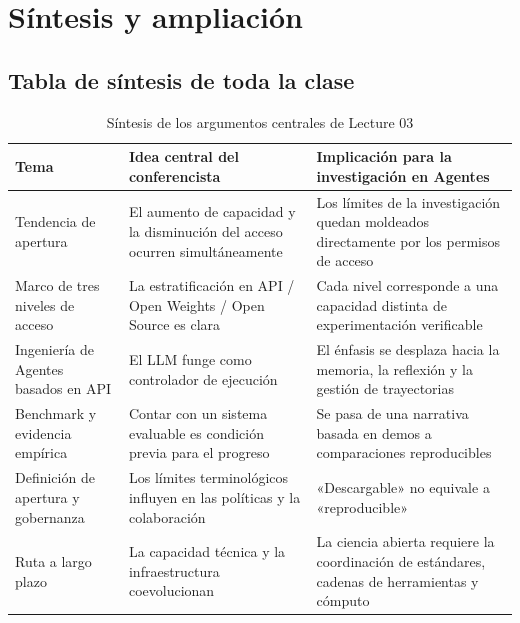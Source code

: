 \documentclass[a4paper]{article}
\begin{document}
\section{Síntesis y ampliación}

\subsection{Tabla de síntesis de toda la clase}
\begin{table}[H]
\centering
\begin{tabular}{p{2.8cm}p{4.1cm}p{4.6cm}}
\toprule
\textbf{Tema} & \textbf{Idea central del conferencista} & \textbf{Implicación para la investigación en Agentes} \\
\midrule
Tendencia de apertura & El aumento de capacidad y la disminución del acceso ocurren simultáneamente & Los límites de la investigación quedan moldeados directamente por los permisos de acceso \\
Marco de tres niveles de acceso & La estratificación en API / Open Weights / Open Source es clara & Cada nivel corresponde a una capacidad distinta de experimentación verificable \\
Ingeniería de Agentes basados en API & El LLM funge como controlador de ejecución & El énfasis se desplaza hacia la memoria, la reflexión y la gestión de trayectorias \\
Benchmark y evidencia empírica & Contar con un sistema evaluable es condición previa para el progreso & Se pasa de una narrativa basada en demos a comparaciones reproducibles \\
Definición de apertura y gobernanza & Los límites terminológicos influyen en las políticas y la colaboración & «Descargable» no equivale a «reproducible» \\
Ruta a largo plazo & La capacidad técnica y la infraestructura coevolucionan & La ciencia abierta requiere la coordinación de estándares, cadenas de herramientas y cómputo \\
\bottomrule
\end{tabular}
\caption{Síntesis de los argumentos centrales de Lecture 03}
\end{table}
\end{document}
